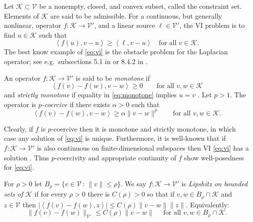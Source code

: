 \documentclass[hidelinks,onefignum,onetabnum,final]{siamart220329}  %
\newcommand{\cK}{\mathcal{K}}
\newcommand{\cV}{\mathcal{V}}
\newcommand{\ip}[2]{\left<#1,#2\right>}
\begin{document}
Let $\cK \subset \cV$ be a nonempty, closed, and convex subset, called the constraint set.  Elements of $\cK$ are said to be admissible.  For a continuous, but generally nonlinear, operator $f:\cK \to \cV'$, and a linear source $\ell\in \cV'$, the VI problem is to find $u\in \cK$ such that
\begin{equation}
\ip{f(u)}{v-u} \ge \ip{\ell}{v-u} \quad \text{for all } v\in \cK. \label{eq:vi}
\end{equation}
The best know example of \eqref{eq:vi} is the obstacle problem for the Laplacian operator; see e.g.~subsections 5.1 in \cite{Ciarlet2002} or 8.4.2 in \cite{Evans2010}.

\begin{definition} \label{def:monotonepcoercive}
An operator $f:\cK \to \cV'$ is said to be \emph{monotone} if
\begin{equation}
\ip{f(v)-f(w)}{v-w} \ge 0 \qquad \text{for all } v,w \in \cK \label{eq:monotone}
\end{equation}
and \emph{strictly monotone} if equality in \eqref{eq:monotone} implies $u=v$ \cite{KinderlehrerStampacchia1980}.  Let $p>1$.  The operator is \emph{$p$-coercive} \cite{Bueler2021conservation} if there exists $\alpha>0$ such that
\begin{equation}
\ip{f(v)-f(w)}{v-w} \ge \alpha \|v-w\|^p \qquad \text{for all } v,w \in \cK. \label{eq:pcoercive}
\end{equation}
\end{definition}

Clearly, if $f$ is $p$-coercive then it is monotone and strictly monotone, in which case any solution of \eqref{eq:vi} is unique.  Furthermore, it is well-known that if $f:\cK \to \cV'$ is also continuous on finite-dimensional subspaces then VI \eqref{eq:vi} has a solution \cite[Corollary III.1.8]{KinderlehrerStampacchia1980}.  Thus $p$-coercivity and appropriate continuity of $f$ show well-posedness for \eqref{eq:vi}.


\begin{definition} \label{def:lipshitz}
For $\rho>0$ let $B_\rho = \{v\in \cV\,:\,\|v\|\le \rho\}$.  We say $f:\cK \to \cV'$ is \emph{Lipshitz on bounded sets of $\cK$} if for every $\rho>0$ there is $C(\rho)>0$ so that if $v,w \in B_\rho \cap \cK$ and $z\in\cV$ then $|\ip{f(v)-f(w)}{z}| \le C(\rho) \|v-w\| \|z\|$.  Equivalently:
\begin{equation}
\|f(v)-f(w)\|_{\cV'} \le C(\rho) \|v-w\| \quad \text{ for all } v,w \in B_\rho \cap \cK.  \label{eq:liponbounded}
\end{equation}
\end{definition}
\end{document}
